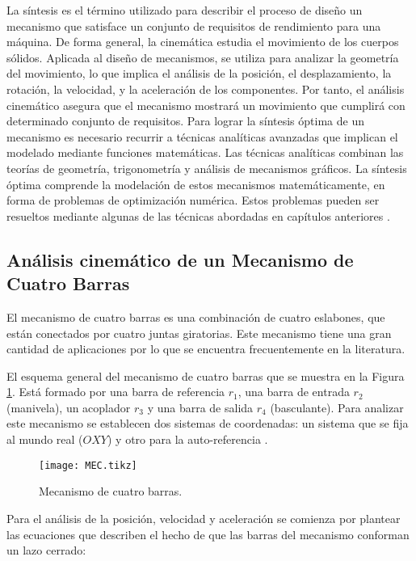  La síntesis es el término utilizado para describir el proceso de diseño un mecanismo que satisface un conjunto de requisitos de rendimiento para una máquina. De forma general, la cinemática estudia el movimiento de los cuerpos sólidos. Aplicada al diseño de mecanismos, se utiliza para analizar la geometría del movimiento, lo que implica el análisis de la posición, el desplazamiento, la rotación, la velocidad, y la aceleración de los componentes. Por tanto, el análisis cinemático asegura que el mecanismo mostrará un movimiento que cumplirá con determinado conjunto de requisitos. Para lograr la síntesis óptima de un mecanismo es necesario recurrir a técnicas analíticas avanzadas que implican el modelado mediante funciones matemáticas. Las técnicas analíticas combinan las teorías de geometría, trigonometría y análisis de mecanismos gráficos. La síntesis óptima comprende la modelación de estos mecanismos matemáticamente, en forma de problemas de optimización numérica. Estos problemas pueden ser resueltos mediante algunas de las técnicas abordadas en capítulos anteriores \cite{myszka2004machines}. 


\subsection{Análisis cinemático de un Mecanismo de Cuatro Barras}\label{sec:Análisis cinemático de un Mecanismo de Cuatro Barras}
El mecanismo de cuatro barras es una combinación de cuatro eslabones, que están conectados por cuatro juntas giratorias. Este mecanismo tiene una gran cantidad de aplicaciones por lo que se encuentra frecuentemente en la literatura. 


El esquema general del mecanismo de cuatro barras que se muestra en la Figura \ref{fig:MEC}. Está formado por una barra de referencia $r_1$, una barra de entrada $r_2$ (manivela), un acoplador $r_3$ y una barra de salida $r_4$ (basculante). Para analizar este mecanismo se establecen dos sistemas de coordenadas: un sistema que se fija al mundo real ($OXY$) y otro para la auto-referencia \cite{herne1_two_swim_2016}.

\begin{figure}[htb]
    \centering
    \resizebox {\textwidth} {\height} {
     \texttt{[image: MEC.tikz]}
     }
    \caption{Mecanismo de cuatro barras.}
    \label{fig:MEC}
\end{figure}
Para el análisis de la posición, velocidad y aceleración se comienza por plantear las ecuaciones que describen el hecho de que las barras del mecanismo conforman un lazo cerrado:

